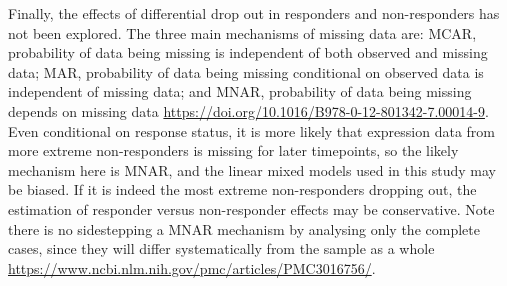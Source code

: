 Finally, the effects of differential drop out in responders and non-responders has not been explored.
The three main mechanisms of missing data are:
\gls{MCAR}, probability of data being missing is independent of both observed and missing data;
\gls{MAR}, probability of data being missing conditional on observed data is independent of missing data;
and \gls{MNAR}, probability of data being missing depends on missing data \url{https://doi.org/10.1016/B978-0-12-801342-7.00014-9}.
Even conditional on response status, it is more likely that expression data from more extreme non-responders is missing for later timepoints, so the likely mechanism here is \gls{MNAR},
and the linear mixed models used in this study may be biased.
If it is indeed the most extreme non-responders dropping out, the estimation of responder versus non-responder effects may be conservative.
Note there is no sidestepping a \gls{MNAR} mechanism by analysing only the complete cases, 
since they will differ systematically from the sample as a whole \url{https://www.ncbi.nlm.nih.gov/pmc/articles/PMC3016756/}.

